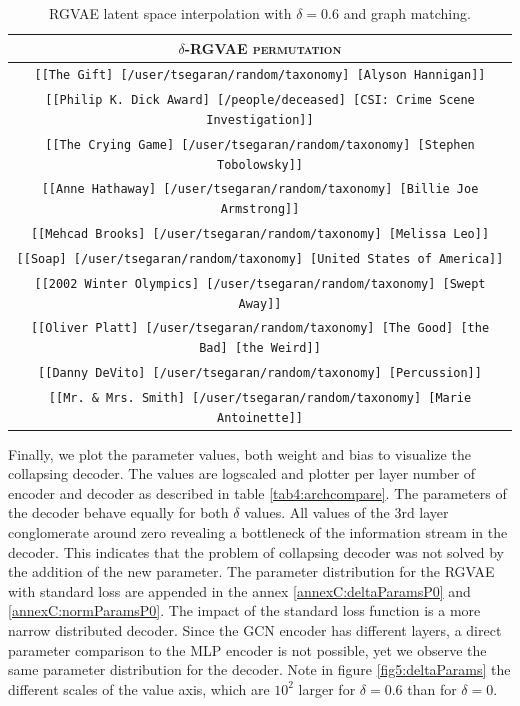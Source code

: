 \begin{table}[H]
  \centering
  \begin{tabular}{|c|}
  \hline
  \rowcolor[HTML]{EFEFEF} 
  \textsc{$\delta$-RGVAE permutation}\\ \hline
  \texttt{[[The Gift] [/user/tsegaran/random/taxonomy] [Alyson Hannigan]]}\\
  \texttt{[[Philip K. Dick Award] [/people/deceased] [CSI: Crime Scene Investigation]]}\\
  \texttt{[[The Crying Game] [/user/tsegaran/random/taxonomy] [Stephen Tobolowsky]]}\\
  \texttt{[[Anne Hathaway] [/user/tsegaran/random/taxonomy] [Billie Joe Armstrong]]}\\
  \texttt{[[Mehcad Brooks] [/user/tsegaran/random/taxonomy] [Melissa Leo]]}\\
  \texttt{[[Soap] [/user/tsegaran/random/taxonomy] [United States of America]]}\\
  \texttt{[[2002 Winter Olympics] [/user/tsegaran/random/taxonomy] [Swept Away]]}\\
  \texttt{[[Oliver Platt] [/user/tsegaran/random/taxonomy] [The Good] [the Bad] [the Weird]]}\\
  \texttt{[[Danny DeVito] [/user/tsegaran/random/taxonomy] [Percussion]]}\\
  \texttt{[[Mr. \& Mrs. Smith] [/user/tsegaran/random/taxonomy] [Marie Antoinette]]}\\  \hline
  \end{tabular}
\caption{RGVAE latent space interpolation with $\delta = 0.6$ and graph matching.}
\label{tab5:ipbtw2Delta}
\end{table}

Finally, we plot the parameter values, both weight and bias to visualize the collapsing decoder. The values are logscaled and plotter per layer number of encoder and decoder as described in table \ref{tab4:archcompare}. The parameters of the decoder behave equally for both $\delta$ values. All values of the 3rd layer conglomerate around zero revealing a bottleneck of the information stream in the decoder. This indicates that the problem of collapsing decoder was not solved by the addition of the new parameter. The parameter distribution for the RGVAE with standard loss are appended in the annex \ref{annexC:deltaParamsP0} and \ref{annexC:normParamsP0}. The impact of the standard loss function is a more narrow distributed decoder. Since the GCN encoder has different layers, a direct parameter comparison to the MLP encoder is not possible, yet we observe the same parameter distribution for the decoder. Note in figure \ref{fig5:deltaParams} the different scales of the value axis, which are $10^2$ larger for $\delta = 0.6$ than for $\delta = 0$.

